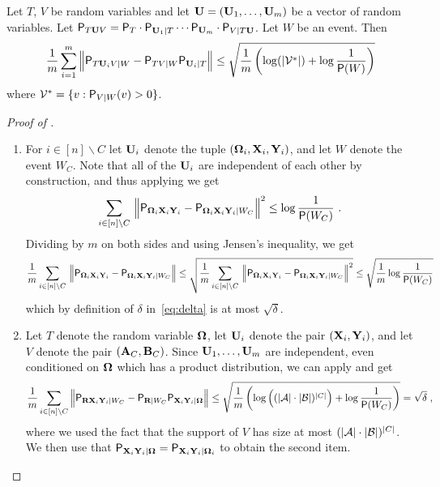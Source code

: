 \begin{corollary}
\label{cor:hol}
Let $T$, $V$ be random variables and let $\bU = (\bU_1,\ldots,\bU_m)$ be a vector of random variables. Let $\P_{T\bU V} = \P_T \cdot \P_{\bU_1 | T} \cdots \P_{\bU_m} \cdot \P_{V|T \bU}$. Let $W$ be an event. Then
\[
	\frac{1}{m} \sum_{i=1}^m \Big \| \P_{T \bU_i V|W} - \P_{TV|W} \P_{\bU_i | T} \Big \| \leq \sqrt{ \frac{1}{m} \left ( \log(|\mathcal{V}^*|) + \log \frac{1}{\P(W)}  \right)}
\]
where $\mathcal{V}^* = \{ v : \P_{V|W}(v) > 0 \}$. 
\end{corollary}

\begin{proof}[Proof of ]
\begin{enumerate}
\item For $i\in [n]\backslash C$ let $\bU_i$ denote the tuple $(\bOmega_i,\bX_i,\bY_i)$, and let $W$ denote the event $W_C$. Note that all of the $\bU_i$ are independent of each other by construction, and thus applying  we get
\[
\sum_{i \in [n] \setminus C} \, \Big \| \P_{\bOmega_i \bX_i \bY_i} - \P_{\bOmega_i \bX_i \bY_i | W_C} \Big \|^2 \leq \log \frac{1}{\P(W_C)}~.
\]
Dividing by $m$ on both sides and using Jensen's inequality, we get
\[
\frac{1}{m} \sum_{i \in [n] \setminus C} \, \Big \| \P_{\bOmega_i \bX_i \bY_i} - \P_{\bOmega_i \bX_i \bY_i | W_C} \Big \| \leq \sqrt{ \frac{1}{m} \sum_{i \in [n] \setminus C} \, \Big \| \P_{\bOmega_i \bX_i \bY_i} - \P_{\bOmega_i \bX_i \bY_i | W_C} \Big \|^2} \leq \sqrt{ \frac{1}{m} \log \frac{1}{\P(W_C)}}
\]
which by definition of $\delta$ in~\eqref{eq:delta} is at most $\sqrt{\delta}$. %

\item Let $T$ denote the random variable $\bOmega$, let $\bU_i$ denote the pair $(\bX_i,\bY_i)$, and let $V$ denote the pair $(\bA_C,\bB_C)$. Since $\bU_1,\ldots,\bU_m$ are independent, even conditioned on $\bOmega$ which has a product distribution, we can apply 
 and get
\begin{equation}
\label{eq:classical-skew-1}
	\frac{1}{m} \sum_{i \in [n] \setminus C} \Big \| \P_{\bR \bX_i \bY_i|W_C} - \P_{\bR|W_C} \P_{\bX_i \bY_i | \bOmega} \Big \| \leq \sqrt{ \frac{1}{m} \left ( \log \Big ( (|\A| \cdot |\B|)^{|C|} \Big) + \log \frac{1}{\P(W_C)}  \right)} = \sqrt{\delta}\;,
\end{equation}
where we used the fact that the support of $V$ has size at most $(|\A| \cdot |\B|)^{|C|}$. We then use that $\P_{\bX_i \bY_i | \bOmega} = \P_{\bX_i \bY_i | \bOmega_i}$ to obtain the second item.


\end{enumerate}
\end{proof}
